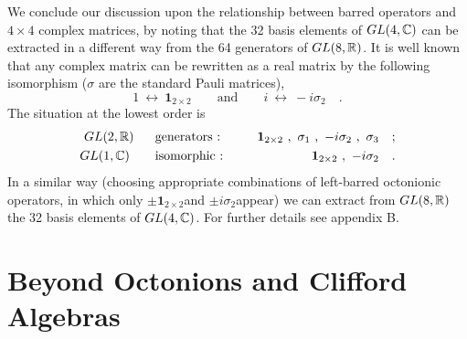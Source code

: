 \documentclass[a4paper,12pt]{book}
\begin{document}
We conclude our discussion upon the relationship between barred operators
and $4\times 4$ complex matrices, by noting that the 32 basis elements of $%
GL(4,\Bbb{C})$ can be extracted in a different way from the 64 generators of 
$GL(8,\Bbb{R})$. It is well known that any complex matrix can be rewritten
as a real matrix by the following isomorphism ($\sigma $ are the standard
Pauli matrices), 
\[
1~\leftrightarrow ~\mathbf{1}_{2\times 2}\quad \quad \mbox{and}\quad \quad
i~\leftrightarrow ~-i\sigma _{2}\quad . 
\]
The situation at the lowest order is 
\begin{eqnarray}
GL(2,\Bbb{R}) &~~~~~\mbox{generators :}~~~~~&\mathbf{1}_{2\times 2}~,~\sigma
_{1}~,~-i\sigma _{2}~,~\sigma _{3}\quad ; \\
GL(1,\Bbb{C})~ &~~~~~\mbox{isomorphic :}~~~~~&\mathbf{1}_{2\times
2}~,~-i\sigma _{2}\quad .
\end{eqnarray}
In a similar way (choosing appropriate combinations of left-barred
octonionic operators, in which only $\pm \mathbf{1}_{2\times 2}$and $\pm
i\sigma _{2}$appear) we can extract from $GL(8,\Bbb{R})$ the 32 basis
elements of $GL(4,\Bbb{C})$. For further details see appendix B.

\section{Beyond Octonions and Clifford Algebras}
\end{document}
